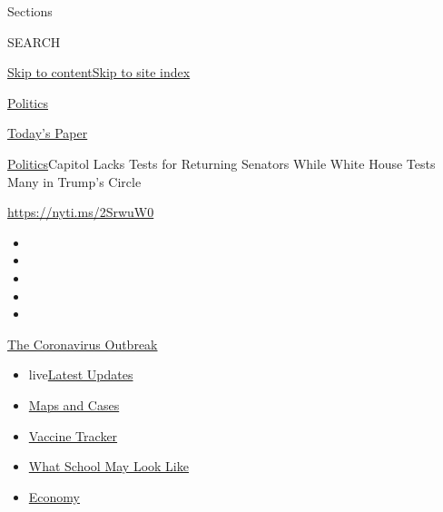 Sections

SEARCH

\protect\hyperlink{site-content}{Skip to
content}\protect\hyperlink{site-index}{Skip to site index}

\href{https://www.nytimes.com/section/politics}{Politics}

\href{https://myaccount.nytimes.com/auth/login?response_type=cookie\&client_id=vi}{}

\href{https://www.nytimes.com/section/todayspaper}{Today's Paper}

\href{/section/politics}{Politics}\textbar{}Capitol Lacks Tests for
Returning Senators While White House Tests Many in Trump's Circle

\url{https://nyti.ms/2SrwuW0}

\begin{itemize}
\item
\item
\item
\item
\item
\end{itemize}

\href{https://www.nytimes.com/news-event/coronavirus?action=click\&pgtype=Article\&state=default\&region=TOP_BANNER\&context=storylines_menu}{The
Coronavirus Outbreak}

\begin{itemize}
\tightlist
\item
  live\href{https://www.nytimes.com/2020/08/01/world/coronavirus-covid-19.html?action=click\&pgtype=Article\&state=default\&region=TOP_BANNER\&context=storylines_menu}{Latest
  Updates}
\item
  \href{https://www.nytimes.com/interactive/2020/us/coronavirus-us-cases.html?action=click\&pgtype=Article\&state=default\&region=TOP_BANNER\&context=storylines_menu}{Maps
  and Cases}
\item
  \href{https://www.nytimes.com/interactive/2020/science/coronavirus-vaccine-tracker.html?action=click\&pgtype=Article\&state=default\&region=TOP_BANNER\&context=storylines_menu}{Vaccine
  Tracker}
\item
  \href{https://www.nytimes.com/interactive/2020/07/29/us/schools-reopening-coronavirus.html?action=click\&pgtype=Article\&state=default\&region=TOP_BANNER\&context=storylines_menu}{What
  School May Look Like}
\item
  \href{https://www.nytimes.com/live/2020/07/31/business/stock-market-today-coronavirus?action=click\&pgtype=Article\&state=default\&region=TOP_BANNER\&context=storylines_menu}{Economy}
\end{itemize}

